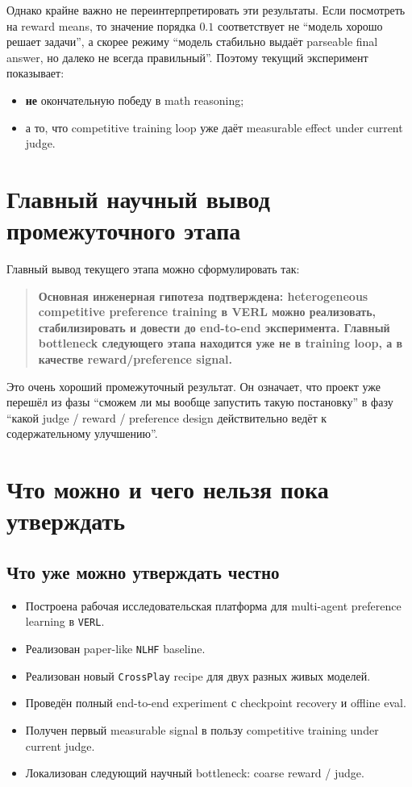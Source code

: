 \documentclass[11pt,a4paper]{article}
\begin{document}
Однако крайне важно не переинтерпретировать эти результаты. Если посмотреть на reward means, то значение порядка $0.1$ соответствует не ``модель хорошо решает задачи'', а скорее режиму ``модель стабильно выдаёт parseable final answer, но далеко не всегда правильный''. Поэтому текущий эксперимент показывает:
\begin{itemize}
  \item \textbf{не} окончательную победу в math reasoning;
  \item а то, что competitive training loop уже даёт measurable effect under current judge.
\end{itemize}

\section{Главный научный вывод промежуточного этапа}

Главный вывод текущего этапа можно сформулировать так:

\begin{quote}
\textbf{Основная инженерная гипотеза подтверждена: heterogeneous competitive preference training в VERL можно реализовать, стабилизировать и довести до end-to-end эксперимента. Главный bottleneck следующего этапа находится уже не в training loop, а в качестве reward/preference signal.}
\end{quote}

Это очень хороший промежуточный результат. Он означает, что проект уже перешёл из фазы ``сможем ли мы вообще запустить такую постановку'' в фазу ``какой judge / reward / preference design действительно ведёт к содержательному улучшению''.

\section{Что можно и чего нельзя пока утверждать}

\subsection{Что уже можно утверждать честно}

\begin{itemize}
  \item Построена рабочая исследовательская платформа для multi-agent preference learning в \texttt{VERL}.
  \item Реализован paper-like \texttt{NLHF} baseline.
  \item Реализован новый \texttt{CrossPlay} recipe для двух разных живых моделей.
  \item Проведён полный end-to-end experiment с checkpoint recovery и offline eval.
  \item Получен первый measurable signal в пользу competitive training under current judge.
  \item Локализован следующий научный bottleneck: coarse reward / judge.
\end{itemize}
\end{document}
